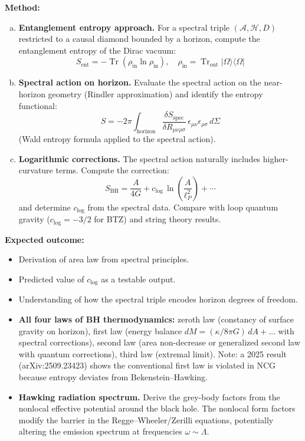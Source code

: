 \documentclass[12pt,a4paper]{article}
\newcommand{\Tr}{\operatorname{Tr}}
\newcommand{\method}[1]{\noindent\textbf{Method:} #1\par}
\newcommand{\outcome}[1]{\noindent\textbf{Expected outcome:} #1\par}
\begin{document}
\method{
\begin{enumerate}[(a)]
  \item \textbf{Entanglement entropy approach.} For a spectral triple
    $(\mathcal{A}, \mathcal{H}, D)$ restricted to a causal diamond bounded
    by a horizon, compute the entanglement entropy of the Dirac vacuum:
    \begin{equation}\label{eq:entanglement}
      S_{\text{ent}} = -\Tr(\rho_{\text{in}}\ln\rho_{\text{in}}), \quad
      \rho_{\text{in}} = \Tr_{\text{out}}|\Omega\rangle\langle\Omega|
    \end{equation}
  \item \textbf{Spectral action on horizon.} Evaluate the spectral action
    on the near-horizon geometry (Rindler approximation) and identify the
    entropy functional:
    \begin{equation}\label{eq:wald-spectral}
      S = -2\pi \int_{\text{horizon}} \frac{\delta S_{\text{spec}}}{\delta R_{\mu\nu\rho\sigma}}
      \, \epsilon_{\mu\nu}\epsilon_{\rho\sigma}\, d\Sigma
    \end{equation}
    (Wald entropy formula applied to the spectral action).
  \item \textbf{Logarithmic corrections.} The spectral action naturally includes
    higher-curvature terms. Compute the correction:
    \begin{equation}\label{eq:log-correction}
      S_{\text{BH}} = \frac{A}{4G} + c_{\log}\,\ln\!\left(\frac{A}{\ell_P^2}\right) + \cdots
    \end{equation}
    and determine $c_{\log}$ from the spectral data. Compare with loop quantum gravity
    ($c_{\log} = -3/2$ for BTZ) and string theory results.
\end{enumerate}
}

\outcome{
\begin{itemize}
  \item Derivation of area law from spectral principles.
  \item Predicted value of $c_{\log}$ as a testable output.
  \item Understanding of how the spectral triple encodes horizon degrees of freedom.
  \item \textbf{All four laws of BH thermodynamics:} zeroth law (constancy of
    surface gravity on horizon), first law (energy balance $dM = (\kappa/8\pi G)\,dA + \ldots$
    with spectral corrections), second law (area non-decrease or generalized
    second law with quantum corrections), third law (extremal limit).
    Note: a 2025 result (arXiv:2509.23423) shows the conventional first law
    is violated in NCG because entropy deviates from Bekenstein--Hawking.
  \item \textbf{Hawking radiation spectrum.} Derive the grey-body factors
    from the nonlocal effective potential around the black hole. The nonlocal
    form factors modify the barrier in the Regge--Wheeler/Zerilli equations,
    potentially altering the emission spectrum at frequencies $\omega \sim \Lambda$.
\end{itemize}
}
\end{document}
